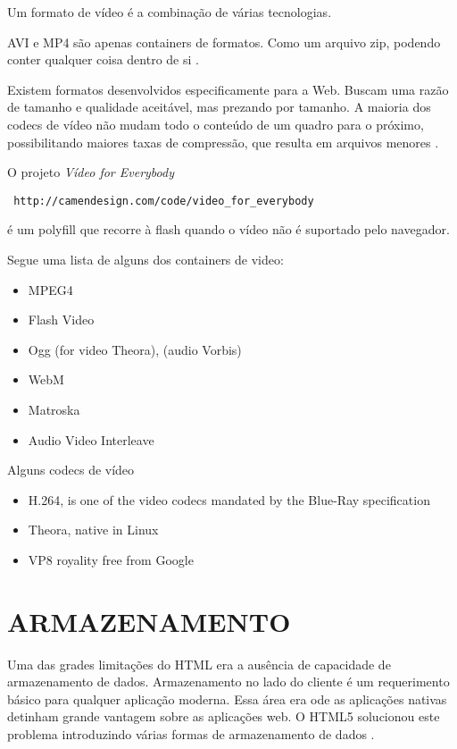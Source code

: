 Um formato de vídeo é a combinação de várias tecnologias.

AVI e MP4 são apenas containers de formatos. Como um arquivo zip, podendo conter qualquer coisa dentro de si \autocite{diveIntohtml}.

Existem formatos desenvolvidos especificamente para a Web. Buscam uma razão de tamanho e qualidade aceitável, mas prezando por tamanho. A maioria dos codecs de vídeo não mudam todo o conteúdo de um quadro para o próximo, possibilitando maiores taxas de compressão, que resulta em arquivos menores \autocite{diveIntohtml}.

O projeto \textit{Vídeo for Everybody} \begin{verbatim} http://camendesign.com/code/video_for_everybody \end{verbatim} é um polyfill que recorre à flash quando o vídeo não é suportado pelo navegador.


Segue uma lista de alguns dos containers de video:
\begin{itemize}
    \item{MPEG4}
    \item{Flash Video}
    \item{Ogg} (for video Theora), (audio Vorbis)
    \item{WebM}
    \item{Matroska}
    \item{Audio Video Interleave}
\end{itemize}

Alguns codecs de vídeo
\begin{itemize}
    \item{H.264, is one of the video codecs mandated by the Blue-Ray specification}
    \item{Theora, native in Linux}
    \item{VP8 royality free from Google}
\end{itemize}

\section{ARMAZENAMENTO}
Uma das grades limitações do HTML era a ausência de capacidade
de armazenamento de dados. Armazenamento no lado do cliente é um
requerimento básico para qualquer aplicação moderna. Essa área
era ode as aplicações nativas detinham grande vantagem sobre as
aplicações web. O HTML5 solucionou este problema introduzindo várias
formas de armazenamento de dados \autocite{html5Tradeoffs}.

